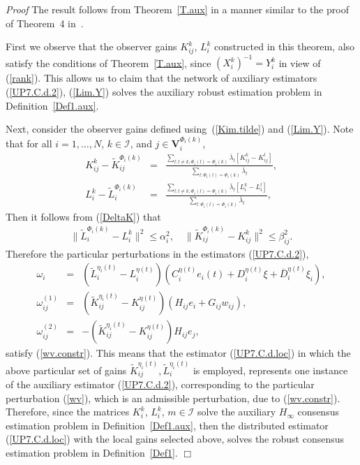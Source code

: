 \documentclass[a4paper,twocolumn]{autart}
\begin{document}
\emph{Proof }
The result follows from Theorem~\ref{T.aux} in a manner similar to the proof of
Theorem~4 in~\cite{XiUP1}.

First we observe that the observer gains $K_{ij}^k$, $L_i^k$ constructed in
this theorem, also satisfy the conditions of Theorem~\ref{T.aux}, since
$(X_i^k)^{-1}=Y_i^k$ in view of (\ref{rank}). This allows us to claim that 
the network of auxiliary estimators
(\ref{UP7.C.d.2}), (\ref{Lim.Y}) solves the auxiliary robust estimation problem in
Definition~\ref{Def1.aux}.

Next, consider the observer gains
defined using~(\ref{Kim.tilde}) and (\ref{Lim.Y}). 
Note that for all $i=1,\ldots,N$, $k\in\mathcal{I} $,
and $j\in\mathbf{V}_i^{\Phi_i(k)}$,  
\begin{eqnarray*}
   \label{eq:32.K}
  K_{ij}^k - \tilde K_{ij}^{\Phi_i(k)} &=&
  \frac{\sum_{l:l\neq k, \Phi_i(l)=\Phi_i(k)}  \bar\lambda_l 
\left[K_{ij}^k-K_{ij}^l\right]}{\sum_{l:\Phi_i(l)=\Phi_i(k)}
\bar\lambda_l}, \\
  \label{eq:32.L}
  L_i^k - \tilde L_i^{\Phi_i(k)} &=&
  \frac{\sum_{l:l\neq k, \Phi_i(l)=\Phi_i(k)}
      \bar\lambda_l \left[L_i^k-L_i^l\right]} {\sum_{l:\Phi_i(l)=\Phi_i(k)}
      \bar\lambda_l },
\end{eqnarray*}
  Then it follows from (\ref{DeltaK}) that 
\begin{eqnarray}
\|\tilde L_i^{\Phi_i(k)}-L_i^k\|^2\le \alpha_i^2, \quad
\|\tilde K_{ij}^{\Phi_i(k)}-K_{ij}^k\|^2\le \beta_{ij}^2. 
\label{wv.constr.nb}
\end{eqnarray}
Therefore the particular perturbations in the
estimators (\ref{UP7.C.d.2}),
 \begin{eqnarray}
   \omega_i   &=&(\tilde
    L_i^{\eta_i(t)}-L_i^{\eta(t)})(C_i^{\eta(t)}e_i(t)+D_i^{\eta(t)}\xi+\bar
    D_i^{\eta(t)}\xi_i), \nonumber \\
   \omega_{ij}^{(1)} &=&
(\tilde K_{ij}^{\eta_i(t)}-K_{ij}^{\eta(t)})(H_{ij}e_i+G_{ij}w_{ij}), 
\nonumber \\
   \omega_{ij}^{(2)}&=&-
(\tilde K_{ij}^{\eta_i(t)}-K_{ij}^{\eta(t)})H_{ij}e_j,
\label{wv}
 \end{eqnarray}
satisfy  (\ref{wv.constr}). 
This means that the estimator (\ref{UP7.C.d.loc}) in which the above
particular set of gains $\tilde K_{ij}^{\eta_i(t)}, \tilde L_i^{\eta_i(t)}$
is employed, represents one instance of the auxiliary  
estimator (\ref{UP7.C.d.2}), corresponding to the particular perturbation
(\ref{wv}), which is an admissible perturbation, due to (\ref{wv.constr}). 
Therefore, since the matrices $K_i^k$, $L_i^k$, 
$m\in\mathcal{I}$ solve the auxiliary $H_\infty$ consensus estimation
problem in Definition~\ref{Def1.aux}, then the distributed estimator
(\ref{UP7.C.d.loc}) with the local gains selected above, solves the robust
consensus estimation problem in Definition~\ref{Def1}. \hfill$\Box$
\end{document}

